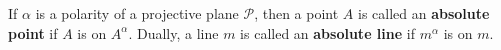 If $\alpha$ is a polarity of a projective plane $\mathcal{P}$, then a point $A$ is called an \textbf{absolute point} if $A$ is on $A^\alpha$. Dually, a line $m$ is called an \textbf{absolute line} if $m^\alpha$ is on $m$.
